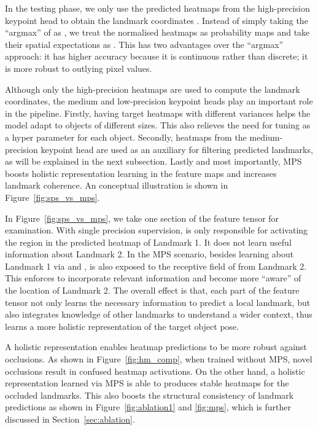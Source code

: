 \documentclass[10pt,twocolumn,letterpaper]{article}
\begin{document}
In the testing phase, we only use the predicted heatmaps  from the high-precision keypoint head to obtain the landmark coordinates . Instead of simply taking the ``argmax'' of  as , we treat the normalised heatmaps  as probability maps and take their spatial expectations as . This has two advantages over the ``argmax'' approach: it has higher accuracy because it is continuous rather than discrete; it is more robust to outlying pixel values. 

Although only the high-precision heatmaps are used to compute the landmark coordinates, the medium and low-precision keypoint heads play an important role in the pipeline. Firstly, having target heatmaps with different variances  helps the model adapt to objects of different sizes. This also relieves the need for tuning  as a hyper parameter for each object. Secondly, heatmaps from the medium-precision keypoint head are used as an auxiliary for filtering predicted landmarks, as will be explained in the next subsection. Lastly and most importantly, MPS boosts holistic representation learning in the feature maps and increases landmark coherence. An conceptual illustration is shown in Figure~\ref{fig:sps_vs_mps}. 

In Figure~\ref{fig:sps_vs_mps}, we take one section of the feature tensor  for examination. With single precision supervision,  is only responsible for activating the region  in the predicted heatmap of Landmark 1. It does not learn useful information about Landmark 2. In the MPS scenario, besides learning about Landmark 1 via  and ,  is also exposed to the receptive field of  from Landmark 2. This enforces  to incorporate relevant information and become more ``aware'' of the location of Landmark 2. The overall effect is that, each part of the feature tensor not only learns the necessary information to predict a local landmark, but also integrates knowledge of other landmarks to understand a wider context, thus learns a more holistic representation of the target object pose. 

A holistic representation enables heatmap predictions to be more robust against occlusions. As shown in Figure~\ref{fig:hm_comp}, when trained without MPS, novel occlusions result in confused heatmap activations. On the other hand, a holistic representation learned via MPS is able to produces stable heatmaps for the occluded landmarks. This also boosts the structural consistency of landmark predictions as shown in Figure~\ref{fig:ablation1} and \ref{fig:mps}, which is further discussed in Section~\ref{sec:ablation}.
\end{document}
